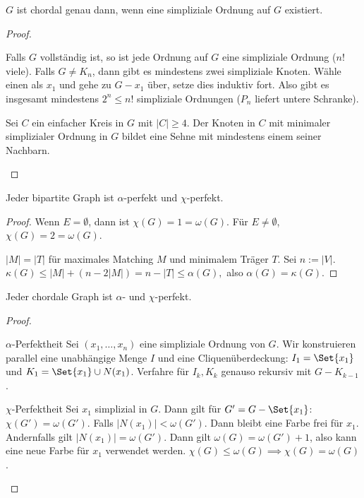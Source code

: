 \begin{st}
    $G$ ist chordal genau dann, wenn eine simpliziale Ordnung auf $G$ existiert.
    \begin{proof}
        \begin{seg}{\ProofImplication}
            Falls $G$ vollständig ist, so ist jede Ordnung auf $G$ eine simpliziale Ordnung ($n!$ viele).
            Falls $G \neq K_n$, dann gibt es mindestens zwei simpliziale Knoten.
            Wähle einen als $x_1$ und gehe zu $G - x_1$ über, setze dies induktiv fort.
            Also gibt es insgesamt mindestens $2^n \le n!$ simpliziale Ordnungen ($P_n$ liefert untere Schranke).
        \end{seg}
        \begin{seg}{\ProofImplication*}
            Sei $C$ ein einfacher Kreis in $G$ mit $|C| \ge 4$.
            Der Knoten in $C$ mit minimaler simplizialer Ordnung in $G$ bildet eine Sehne mit mindestens einem seiner Nachbarn.
        \end{seg}
    \end{proof}
\end{st}

\begin{st}
    Jeder bipartite Graph ist $\alpha$-perfekt und $\chi$-perfekt.
    \begin{proof}
        Wenn $E = \emptyset$, dann ist $\chi(G) = 1 = \omega(G)$.
        Für $E \neq \emptyset$, $\chi(G) = 2 = \omega(G)$.

        $|M| = |T|$ für maximales Matching $M$ und minimalem Träger $T$.
        Sei $n := |V|$.
        \begin{math}
            \kappa(G) \le |M| + (n - 2 |M|)
            = n - |T|
            \le \alpha(G),
        \end{math}
        also $\alpha(G) = \kappa(G)$.
    \end{proof}
\end{st}

\begin{st}
    Jeder chordale Graph ist $\alpha$- und $\chi$-perfekt.
    \begin{proof}
        \begin{seg}{$\alpha$-Perfektheit}
            Sei $(x_1, \dotsc, x_n)$ eine simpliziale Ordnung von $G$.
            Wir konstruieren parallel eine unabhängige Menge $I$ und eine Cliquenüberdeckung: $I_1 = \Set{x_1}$ und $K_1 = \Set{x_1} \cup N(x_1)$.
            Verfahre für $I_k, K_k$ genauso rekursiv mit $G - K_{k-1}$.
        \end{seg}
        \begin{seg}{$\chi$-Perfektheit}
            Sei $x_1$ simplizial in $G$.
            Dann gilt für $G' = G - \Set{x_1}$: $\chi(G') = \omega(G')$.
            Falls $|N(x_1)| < \omega(G')$.
            Dann bleibt eine Farbe frei für $x_1$.
            Andernfalls gilt $|N(x_1)| = \omega(G')$.
            Dann gilt $\omega(G) = \omega(G') + 1$, also kann eine neue Farbe für $x_1$ verwendet werden.
            $\chi(G) \le \omega(G) \implies \chi(G) = \omega(G)$.
        \end{seg}
    \end{proof}
\end{st}


